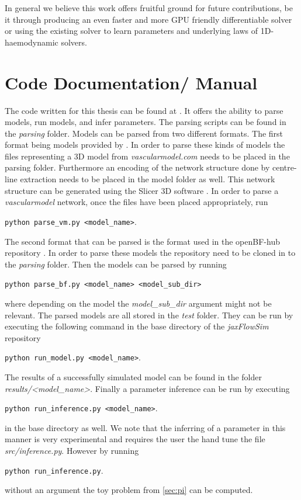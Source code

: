 \documentclass[a4paper, oneside]{discothesis}
\begin{document}
In general we believe this work offers fruitful ground for future contributions, be it through producing an even faster and more GPU friendly differentiable solver or using the existing solver to learn parameters and underlying laws of 1D-haemodynamic solvers.






\appendix
\chapter{Code Documentation/ Manual} \label{app:doc}
The code written for this thesis can be found at \cite{jaxflowsim}.
It offers the ability to parse models, run models, and infer parameters.
The parsing scripts can be found in the \emph{parsing} folder.
Models can be parsed from two different formats.
The first format being models provided by \cite{vascularmodel}.
In order to parse these kinds of models the files representing a 3D model from \emph{vascularmodel.com} needs to be placed in the parsing folder.
Furthermore an encoding of the network structure done by centre-line extraction needs to be placed in the model folder as well.
This network structure can be generated using the Slicer 3D software \cite{fedorov20123d}.
In order to parse a \emph{vascularmodel} network, once the files have been placed appropriately, run

\texttt{python parse\_vm.py <model\_name>}.

The second format that can be parsed is the format used in the openBF-hub repository \cite{openbfhub}.
In order to parse these models the repository need to be cloned in to the \emph{parsing} folder.
Then the models can be parsed by running

\texttt{python parse\_bf.py <model\_name> <model\_sub\_dir>}

where depending on the model the \emph{model\_sub\_dir} argument might not be relevant. 
The parsed models are all stored in the \emph{test} folder.
They can be run by executing the following command in the base directory of the \emph{jaxFlowSim} repository

\texttt{python run\_model.py <model\_name>}.

The results of a successfully simulated model can be found in the folder \emph{results/<model\_name>}.
Finally a parameter inference can be run by executing

\texttt{python run\_inference.py <model\_name>}.

in the base directory as well.
We note that the inferring of a parameter in this manner is very experimental and requires the user the hand tune the file \emph{src/inference.py}.
However by running 

\texttt{python run\_inference.py}.

without an argument the toy problem from \autoref{sec:pi} can be computed.
\end{document}
